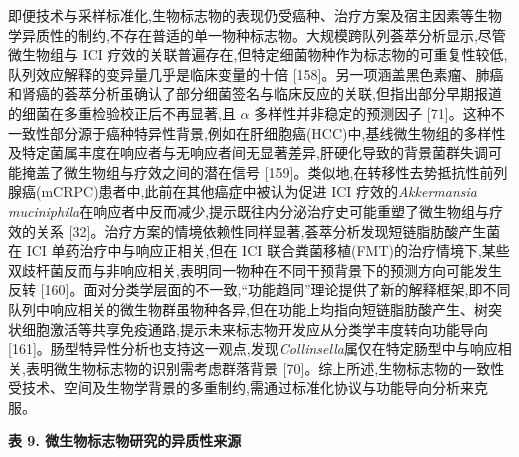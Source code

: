 \documentclass[11pt]{article}
\begin{document}
即便技术与采样标准化,生物标志物的表现仍受癌种、治疗方案及宿主因素等生物学异质性的制约,不存在普适的单一物种标志物。大规模跨队列荟萃分析显示,尽管微生物组与 ICI 疗效的关联普遍存在,但特定细菌物种作为标志物的可重复性较低,队列效应解释的变异量几乎是临床变量的十倍 {[}158{]}。另一项涵盖黑色素瘤、肺癌和肾癌的荟萃分析虽确认了部分细菌签名与临床反应的关联,但指出部分早期报道的细菌在多重检验校正后不再显著,且 \(\alpha\) 多样性并非稳定的预测因子 {[}71{]}。这种不一致性部分源于癌种特异性背景,例如在肝细胞癌(HCC)中,基线微生物组的多样性及特定菌属丰度在响应者与无响应者间无显著差异,肝硬化导致的背景菌群失调可能掩盖了微生物组与疗效之间的潜在信号 {[}159{]}。类似地,在转移性去势抵抗性前列腺癌(mCRPC)患者中,此前在其他癌症中被认为促进 ICI 疗效的\emph{Akkermansia muciniphila}在响应者中反而减少,提示既往内分泌治疗史可能重塑了微生物组与疗效的关系 {[}32{]}。治疗方案的情境依赖性同样显著,荟萃分析发现短链脂肪酸产生菌在 ICI 单药治疗中与响应正相关,但在 ICI 联合粪菌移植(FMT)的治疗情境下,某些双歧杆菌反而与非响应相关,表明同一物种在不同干预背景下的预测方向可能发生反转 {[}160{]}。面对分类学层面的不一致,``功能趋同''理论提供了新的解释框架,即不同队列中响应相关的微生物群虽物种各异,但在功能上均指向短链脂肪酸产生、树突状细胞激活等共享免疫通路,提示未来标志物开发应从分类学丰度转向功能导向 {[}161{]}。肠型特异性分析也支持这一观点,发现\emph{Collinsella}属仅在特定肠型中与响应相关,表明微生物标志物的识别需考虑群落背景 {[}70{]}。综上所述,生物标志物的一致性受技术、空间及生物学背景的多重制约,需通过标准化协议与功能导向分析来克服。

\textbf{表 9. 微生物标志物研究的异质性来源}
\end{document}
